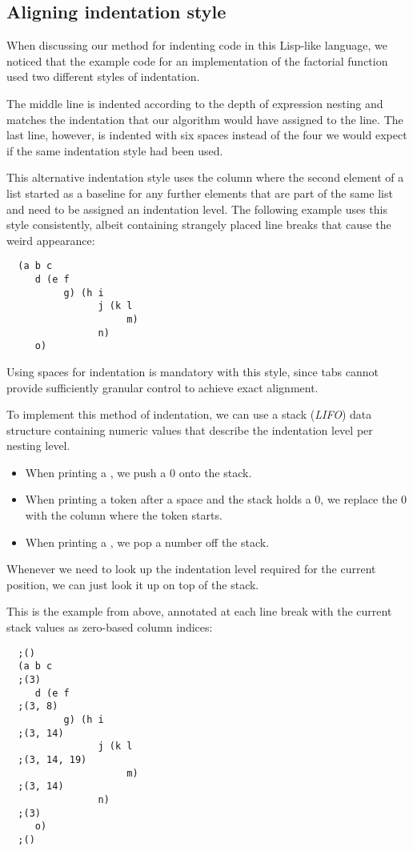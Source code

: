 \subsection{Aligning indentation style}

When discussing our method for indenting code in this Lisp-like language,
we noticed that the example code for an implementation of the factorial function
used two different styles of indentation.

The middle line is indented according to the depth of expression nesting
and matches the indentation that our algorithm would have assigned to the line.
The last line, however, is indented with six spaces instead of the four
we would expect if the same indentation style had been used.

This alternative indentation style uses the column where the
second element of a list started as a baseline for any further elements
that are part of the same list and need to be assigned an indentation level.
The following example uses this style consistently,
albeit containing strangely placed line breaks that cause the weird appearance:
\begin{verbatim}
  (a b c
     d (e f
          g) (h i
                j (k l
                     m)
                n)
     o)
\end{verbatim}
Using spaces for indentation is mandatory with this style,
since tabs cannot provide sufficiently granular control to achieve exact alignment.

To implement this method of indentation, we can use a stack (\textit{LIFO}) data structure
containing numeric values that describe the indentation level per nesting level.
\begin{itemize}
  \item When printing a , we push a 0 onto the stack.
  \item When printing a token after a space and the stack holds a 0,
  we replace the 0 with the column where the token starts.
  \item When printing a , we pop a number off the stack.
\end{itemize}
Whenever we need to look up the indentation level required for the current position,
we can just look it up on top of the stack.

This is the example from above, annotated at each line break
with the current stack values as zero-based column indices:
\begin{verbatim}
  ;()
  (a b c
  ;(3)
     d (e f
  ;(3, 8)
          g) (h i
  ;(3, 14)
                j (k l
  ;(3, 14, 19)
                     m)
  ;(3, 14)
                n)
  ;(3)
     o)
  ;()
\end{verbatim}


